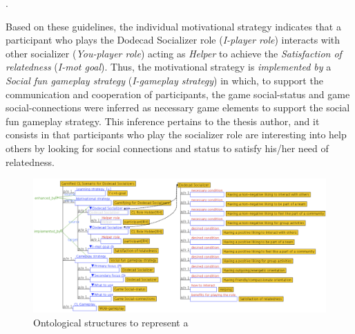 \begin{citacao}
 .
\end{citacao}

Based on these guidelines, the individual motivational strategy  indicates that a participant who plays the Dodecad Socializer role (\emph{I-player role}) interacts with other socializer (\emph{You-player role}) acting as \emph{Helper} to achieve the \emph{Satisfaction of relatedness} (\emph{I-mot goal}).
Thus, the motivational strategy is \emph{implemented by} a \emph{Social fun gameplay strategy} (\emph{I-gameplay strategy}) in which, to support the communication and cooperation of participants, the game social-status and game social-connections were inferred as necessary game elements to support the social fun gameplay strategy.
This inference pertains to the thesis author, and it consists in that participants who play the socializer role are interesting into help others by looking for social connections and status to satisfy his/her need of relatedness.

\begin{figure}[!htbp]
 \caption[Ontological structures to represent a gamified CL scenario for dodecad socializers]{Ontological structures to represent a }
 \label{fig:ontological-structure-gamified-cl-scenario-dodecad-socializers}
 \centering
 \includegraphics[width=1\textwidth]{images/chap-ontogacles1/ontological-structure-gamified-cl-scenario-dodecad-socializers.png} 
 \fautor
\end{figure}

